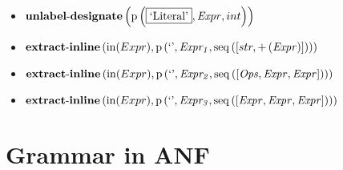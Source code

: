 {\begin{itemize}
\item $\mathbf{unlabel\text{-}designate}\\\left(\mathrm{p}\left(\fbox{\text{`Literal'}},\mathit{Expr},int\right)\right)$
\item $\mathbf{extract\text{-}inline}\left(\mathrm{in}(Expr),\\\mathrm{p}\left(\text{`'},\mathit{Expr_1},\mathrm{seq}\left(\left[str, {+}\left(\mathit{Expr}\right)\right]\right)\right)\right)$
\item $\mathbf{extract\text{-}inline}\left(\mathrm{in}(Expr),\\\mathrm{p}\left(\text{`'},\mathit{Expr_2},\mathrm{seq}\left(\left[\mathit{Ops}, \mathit{Expr}, \mathit{Expr}\right]\right)\right)\right)$
\item $\mathbf{extract\text{-}inline}\left(\mathrm{in}(Expr),\\\mathrm{p}\left(\text{`'},\mathit{Expr_3},\mathrm{seq}\left(\left[\mathit{Expr}, \mathit{Expr}, \mathit{Expr}\right]\right)\right)\right)$
\end{itemize}}

\section{Grammar in ANF}

